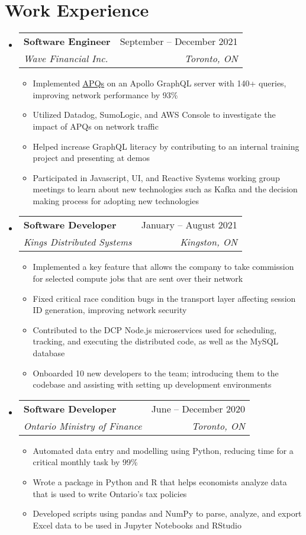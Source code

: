 \documentclass[letterpaper,11pt]{article}
\makeatletter
\newcommand{\resumeItem}[1]{
  \item\small{
    {#1 \vspace{-2pt}}
  }
}
\newcommand{\resumeSubheading}[4]{
  \vspace{-2pt}\item
    \begin{tabular*}{0.97\textwidth}[t]{l@{\extracolsep{\fill}}r}
      \textbf{#1} & #2 \\
      \textit{\small#3} & \textit{\small #4} \\
    \end{tabular*}\vspace{-7pt}
}
\newcommand{\resumeSubHeadingListStart}{\begin{itemize}[leftmargin=0.15in, label={}]}
\newcommand{\resumeSubHeadingListEnd}{\end{itemize}}
\newcommand{\resumeItemListStart}{\begin{itemize}}
\newcommand{\resumeItemListEnd}{\end{itemize}\vspace{-5pt}}
\makeatother
\begin{document}
\section{Work Experience}
  \resumeSubHeadingListStart
    \resumeSubheading
      {Software Engineer}{September -- December 2021}
      {Wave Financial Inc.}{Toronto, ON}
      \resumeItemListStart 
        \resumeItem{Implemented \href{https://www.apollographql.com/docs/apollo-server/performance/apq/}{\underline{APQs}} on an Apollo GraphQL server with 140+ queries, improving network performance by 93\%}
        \resumeItem{Utilized Datadog, SumoLogic, and AWS Console to investigate the impact of APQs on network traffic}
        \resumeItem{Helped increase GraphQL literacy by contributing to an internal training project and presenting at demos}
        \resumeItem{Participated in Javascript, UI, and Reactive Systems working group meetings to learn about new technologies such as Kafka and the decision making process for adopting new technologies}
      \resumeItemListEnd
    
    \resumeSubheading
      {Software Developer}{January -- August 2021}
      {Kings Distributed Systems}{Kingston, ON}
      \resumeItemListStart
        \resumeItem{Implemented a key feature that allows the company to take commission for selected compute jobs that are sent over their network}
        \resumeItem{Fixed critical race condition bugs in the transport layer affecting session ID generation, improving network security}
        \resumeItem{Contributed to the DCP Node.js microservices used for scheduling, tracking, and executing the distributed code, as well as the MySQL database}
        \resumeItem{Onboarded 10 new developers to the team; introducing them to the codebase and assisting with setting up development environments}
      \resumeItemListEnd

    \resumeSubheading
      {Software Developer}{June -- December 2020}
      {Ontario Ministry of Finance}{Toronto, ON}
      \resumeItemListStart
        \resumeItem{Automated data entry and modelling using Python, reducing time for a critical monthly task by 99\%}
        \resumeItem{Wrote a package in Python and R that helps economists analyze data that is used to write Ontario's tax policies}
        \resumeItem{Developed scripts using pandas and NumPy to parse, analyze, and export Excel data to be used in Jupyter Notebooks and RStudio}
      \resumeItemListEnd
  \resumeSubHeadingListEnd
\end{document}
